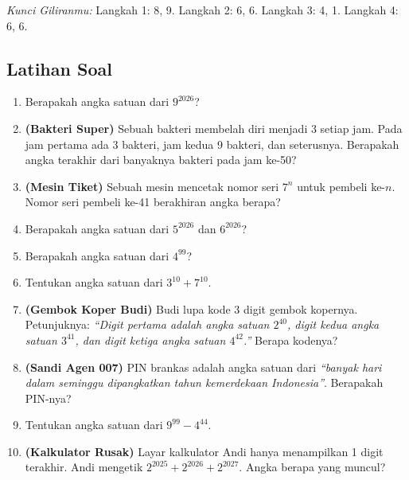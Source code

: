 \documentclass[11pt,a4paper]{article}
\begin{document}
\textit{Kunci Giliranmu:} Langkah 1: 8, 9. \quad Langkah 2: 6, 6. \quad Langkah 3: 4, 1. \quad
Langkah 4: 6, 6.

\newpage
\subsection*{Latihan Soal}

\begin{enumerate}
    \item Berapakah angka satuan dari $9^{2026}$?
    \item \textbf{(Bakteri Super)} Sebuah bakteri membelah diri menjadi 3 setiap jam. Pada jam
          pertama ada 3 bakteri, jam kedua 9 bakteri, dan seterusnya. Berapakah angka terakhir dari
          banyaknya bakteri pada jam ke-50?
    \item \textbf{(Mesin Tiket)} Sebuah mesin mencetak nomor seri $7^n$ untuk pembeli ke-$n$.
          Nomor seri pembeli ke-41 berakhiran angka berapa?
    \item Berapakah angka satuan dari $5^{2026}$ dan $6^{2026}$?
    \item Berapakah angka satuan dari $4^{99}$?
\end{enumerate}

\begin{enumerate}
    \setcounter{enumi}{5}
    \item Tentukan angka satuan dari $3^{10} + 7^{10}$.
    \item \textbf{(Gembok Koper Budi)} Budi lupa kode 3 digit gembok kopernya. Petunjuknya:
          \textit{``Digit pertama adalah angka satuan $2^{40}$, digit kedua angka satuan $3^{41}$,
          dan digit ketiga angka satuan $4^{42}$.''} Berapa kodenya?
    \item \textbf{(Sandi Agen 007)} PIN brankas adalah angka satuan dari \textit{``banyak hari
          dalam seminggu dipangkatkan tahun kemerdekaan Indonesia''}. Berapakah PIN-nya?
    \item Tentukan angka satuan dari $9^{99} - 4^{44}$.
    \item \textbf{(Kalkulator Rusak)} Layar kalkulator Andi hanya menampilkan 1 digit terakhir.
          Andi mengetik $2^{2025} + 2^{2026} + 2^{2027}$. Angka berapa yang muncul?
\end{enumerate}
\end{document}
